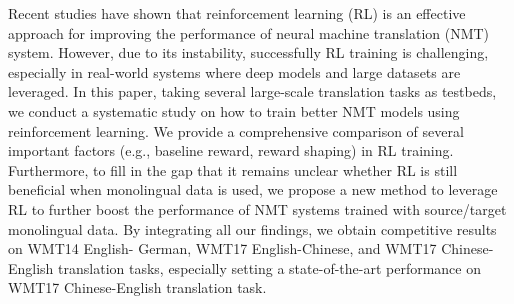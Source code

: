 Recent studies have shown that reinforcement learning (RL) is an effective approach for improving the performance of neural machine translation (NMT) system.  However, due to its instability,  successfully RL training is challenging, especially in real-world systems where deep models and large datasets are leveraged. In this paper, taking several large-scale translation tasks as testbeds, we conduct a systematic study on how to train better NMT models using reinforcement learning. We provide a comprehensive comparison of several important factors (e.g., baseline reward, reward shaping) in RL training. Furthermore, to fill in the gap that it remains unclear whether RL is still beneficial when monolingual data is used,  we propose a new method to leverage RL to further boost the performance of NMT systems trained with source/target monolingual data. By integrating all our findings, we obtain competitive results on WMT14 English- German, WMT17 English-Chinese, and WMT17 Chinese-English translation tasks, especially setting a state-of-the-art performance on WMT17 Chinese-English translation task.
